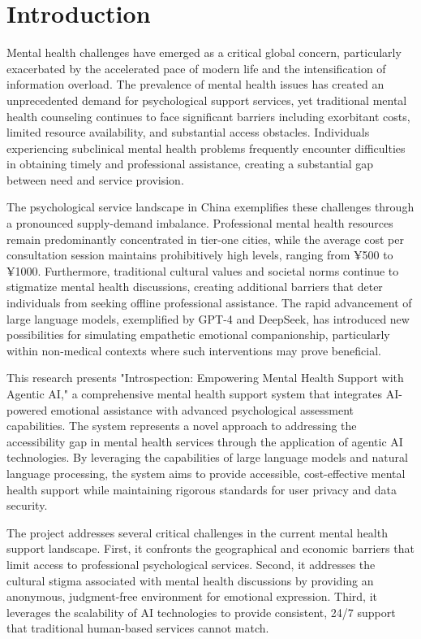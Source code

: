 \section{Introduction}
\label{sec:introduction}

Mental health challenges have emerged as a critical global concern, particularly exacerbated by the accelerated pace of modern life and the intensification of information overload. The prevalence of mental health issues has created an unprecedented demand for psychological support services, yet traditional mental health counseling continues to face significant barriers including exorbitant costs, limited resource availability, and substantial access obstacles. Individuals experiencing subclinical mental health problems frequently encounter difficulties in obtaining timely and professional assistance, creating a substantial gap between need and service provision.

The psychological service landscape in China exemplifies these challenges through a pronounced supply-demand imbalance. Professional mental health resources remain predominantly concentrated in tier-one cities, while the average cost per consultation session maintains prohibitively high levels, ranging from ¥500 to ¥1000. Furthermore, traditional cultural values and societal norms continue to stigmatize mental health discussions, creating additional barriers that deter individuals from seeking offline professional assistance. The rapid advancement of large language models, exemplified by GPT-4 and DeepSeek, has introduced new possibilities for simulating empathetic emotional companionship, particularly within non-medical contexts where such interventions may prove beneficial.

This research presents "Introspection: Empowering Mental Health Support with Agentic AI," a comprehensive mental health support system that integrates AI-powered emotional assistance with advanced psychological assessment capabilities. The system represents a novel approach to addressing the accessibility gap in mental health services through the application of agentic AI technologies. By leveraging the capabilities of large language models and natural language processing, the system aims to provide accessible, cost-effective mental health support while maintaining rigorous standards for user privacy and data security.

The project addresses several critical challenges in the current mental health support landscape. First, it confronts the geographical and economic barriers that limit access to professional psychological services. Second, it addresses the cultural stigma associated with mental health discussions by providing an anonymous, judgment-free environment for emotional expression. Third, it leverages the scalability of AI technologies to provide consistent, 24/7 support that traditional human-based services cannot match.

